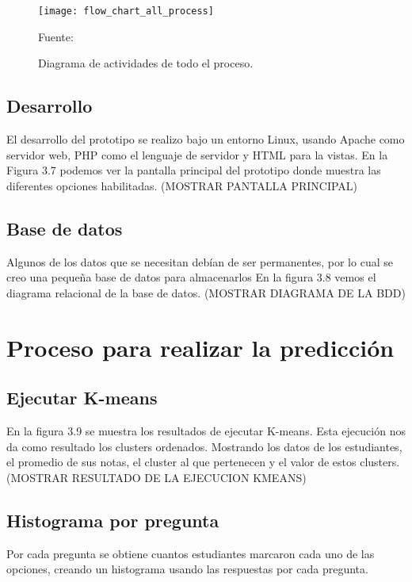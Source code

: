 \begin{figure}[ht]
	\begin{center}
		\texttt{[image: flow\_chart\_all\_process]}
	\end{center}
	\begin{center}
		\vskip -0.5cm
		\caption{\small{Diagrama de actividades de todo el proceso.}}
		{\small{Fuente: }}
	\end{center}
\end{figure}


\subsection{Desarrollo}

El desarrollo del prototipo se realizo bajo un entorno Linux, usando Apache como servidor web, PHP como el lenguaje de servidor y HTML para la vistas. En la Figura 3.7 podemos ver la pantalla principal del prototipo donde muestra las diferentes opciones habilitadas. (MOSTRAR PANTALLA PRINCIPAL)

\subsection{Base de datos}
Algunos de los datos que se necesitan debían de ser permanentes, por lo cual se creo una pequeña base de datos para almacenarlos En la figura 3.8 vemos el diagrama relacional de la base de datos. (MOSTRAR DIAGRAMA DE LA BDD)


\section{Proceso para realizar la predicción} 

\subsection{Ejecutar K-means}

En la figura 3.9 se muestra los resultados de ejecutar K-means. Esta ejecución nos da como resultado los clusters ordenados. Mostrando los datos de los estudiantes, el promedio de sus notas, el cluster al que pertenecen y el valor de estos clusters.
(MOSTRAR RESULTADO DE LA EJECUCION KMEANS)

\subsection{Histograma por pregunta}

Por cada pregunta se obtiene cuantos estudiantes marcaron cada uno de las opciones, creando un histograma usando las respuestas por cada pregunta.

